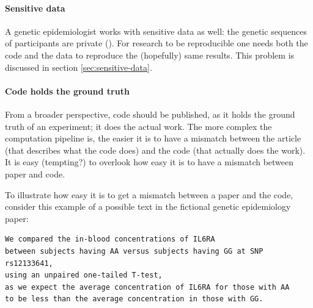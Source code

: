 \paragraph{Sensitive data}

A genetic epidemiologist works with sensitive data as well:
the genetic sequences of participants are private (\cite{clayton2019law}).
For research to be reproducible one needs both the code and the data
to reproduce the (hopefully) same results.
This problem is discussed in section \ref{sec:sensitive-data}.

\paragraph{Code holds the ground truth}

From a broader perspective, code should be published, as it holds the
ground truth of an experiment; it does the actual work.
The more complex the computation pipeline is, the easier it is
to have a mismatch between the article (that describes what the
code does) and the code (that actually does the work).
It is easy (tempting?) to overlook how easy it is to have a mismatch
between paper and code.

To illustrate how easy it is to get a mismatch between a paper
and the code, 
consider this example of a possible text in the fictional 
genetic epidemiology paper:

\begin{verbatim}
We compared the in-blood concentrations of IL6RA 
between subjects having AA versus subjects having GG at SNP rs12133641,
using an unpaired one-tailed T-test,
as we expect the average concentration of IL6RA for those with AA 
to be less than the average concentration in those with GG.
\end{verbatim}

